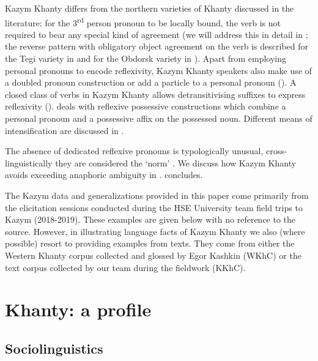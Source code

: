\documentclass[output=paper]{langscibook}
\begin{document}
Kazym Khanty differs from the northern varieties of Khanty discussed in the literature: for the 3\textsuperscript{rd} person pronoun to be locally bound, the verb is not required to bear any special kind of agreement (we will address this in detail in ; the reverse pattern with obligatory object agreement on the verb is described for the Tegi variety in \citealt{VolkovaReuland2014} and for the Obdorsk variety in \citealt{Nikolaeva1999Ostyak}). Apart from employing personal pronouns to encode reflexivity, Kazym Khanty speakers also make use of %
a doubled pronoun construction or add a particle to a personal pronoun (). A closed class of verbs in Kazym Khanty allows detransitivising suffixes to express reflexivity ().  deals with reflexive possessive constructions which combine a personal pronoun and a possessive affix on the possessed noun. Different means of intensification are discussed in . 

The absence of dedicated reflexive pronouns is typologically unusual, cross-linguistically they are considered the ‘norm’ \citep{Moyse-Faurie2008, HeineMiyashita2008}. We discuss how Kazym Khanty avoids exceeding anaphoric ambiguity in .  concludes. 

The Kazym data and generalizations provided in this paper come primarily from the elicitation sessions conducted during the HSE University team field trips to Kazym (2018-2019). These examples are given below with no reference to the source. However, in illustrating language facts of Kazym Khanty we also (where possible) resort to providing examples from texts. They come from either the Western Khanty corpus collected and glossed by Egor Kashkin (WKhC) or the text corpus collected by our team during the fieldwork (KKhC).

\section{{Khanty:} {a} {profile}}\label{sec:Volkova:2}
\subsection{{Sociolinguistics}}\label{sec:Volkova:2.1}
\end{document}
